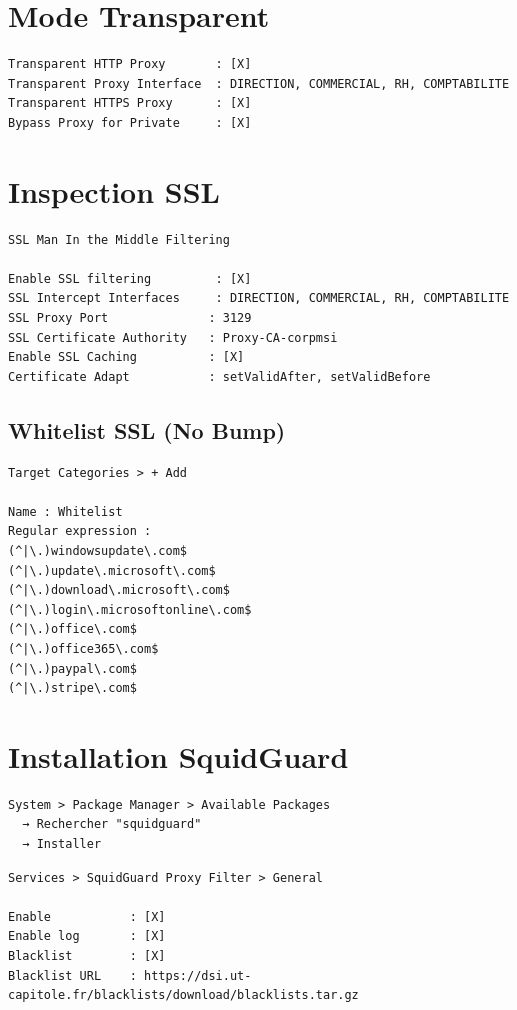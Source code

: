 \section{Mode Transparent}

\begin{lstlisting}
Transparent HTTP Proxy       : [X]
Transparent Proxy Interface  : DIRECTION, COMMERCIAL, RH, COMPTABILITE
Transparent HTTPS Proxy      : [X]
Bypass Proxy for Private     : [X]
\end{lstlisting}

\section{Inspection SSL}

\begin{lstlisting}
SSL Man In the Middle Filtering

Enable SSL filtering         : [X]
SSL Intercept Interfaces     : DIRECTION, COMMERCIAL, RH, COMPTABILITE
SSL Proxy Port              : 3129
SSL Certificate Authority   : Proxy-CA-corpmsi
Enable SSL Caching          : [X]
Certificate Adapt           : setValidAfter, setValidBefore
\end{lstlisting}

\subsection{Whitelist SSL (No Bump)}

\begin{lstlisting}
Target Categories > + Add

Name : Whitelist
Regular expression :
(^|\.)windowsupdate\.com$
(^|\.)update\.microsoft\.com$
(^|\.)download\.microsoft\.com$
(^|\.)login\.microsoftonline\.com$
(^|\.)office\.com$
(^|\.)office365\.com$
(^|\.)paypal\.com$
(^|\.)stripe\.com$
\end{lstlisting}

\section{Installation SquidGuard}

\begin{lstlisting}
System > Package Manager > Available Packages
  → Rechercher "squidguard"
  → Installer
\end{lstlisting}

\begin{lstlisting}
Services > SquidGuard Proxy Filter > General

Enable           : [X]
Enable log       : [X]
Blacklist        : [X]
Blacklist URL    : https://dsi.ut-capitole.fr/blacklists/download/blacklists.tar.gz
\end{lstlisting}

